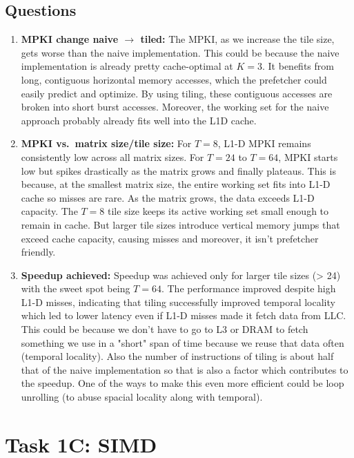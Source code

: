 \documentclass[11pt]{article}
\begin{document}
\subsection{Questions}
\begin{enumerate}[leftmargin=1.6em, itemsep=0.3em]

    \item \textbf{MPKI change naive $\to$ tiled:} The MPKI, as we increase the tile size, gets worse than the naive implementation.
    This could be because the naive implementation is already pretty cache-optimal at $K=3$. It benefits from long, contiguous horizontal memory accesses,
    which the prefetcher could easily predict and optimize. By using tiling, these contiguous accesses are broken into short burst accesses.
    Moreover, the working set for the naive approach probably already fits well into the L1D cache.

    \item \textbf{MPKI vs.\ matrix size/tile size:} For $T=8$, L1-D MPKI remains consistently low across all matrix sizes.
    For $T=24$ to $T=64$, MPKI starts low but spikes drastically as the matrix grows and finally plateaus.
    This is because, at the smallest matrix size, the entire working set fits into L1-D cache so misses are rare.
    As the matrix grows, the data exceeds L1-D capacity. The $T=8$ tile size keeps its active working set small enough to remain in cache.
    But larger tile sizes introduce vertical memory jumps that exceed cache capacity, causing misses and moreover, it isn't prefetcher friendly.

    \item \textbf{Speedup achieved:} Speedup was achieved only for larger tile sizes (> 24) with the sweet spot being $T=64$.
    The performance improved despite high L1-D misses, indicating that tiling successfully improved temporal locality which led to lower latency even
    if L1-D misses made it fetch data from LLC. This could be because we don't have to go to L3 or DRAM to fetch something we use in a "short" span of time
    because we reuse that data often (temporal locality). Also the number of instructions of tiling is about half
    that of the naive implementation so that is also a factor which contributes to the speedup.
    One of the ways to make this even more efficient could be loop unrolling (to abuse spacial locality along with temporal).
\end{enumerate}

\section{Task 1C: SIMD}
\end{document}
